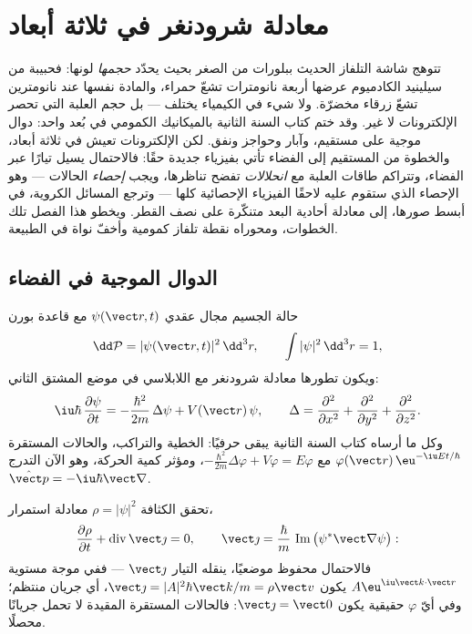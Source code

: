 \chapter{معادلة شرودنغر في ثلاثة أبعاد}\label{ch:b3:schrodinger-three-dimensions}

تتوهج شاشة التلفاز الحديث ببلورات من الصغر بحيث يحدّد
\emph{حجمها} لونها: فحبيبة من سيلينيد الكادميوم عرضها أربعة
نانومترات تشعّ حمراء، والمادة نفسها عند نانومترين تشعّ زرقاء
مخضرّة. ولا شيء في الكيمياء يختلف --- بل حجم العلبة التي تحصر
الإلكترونات لا غير. وقد ختم كتاب السنة الثانية بالميكانيك
الكمومي في بُعد واحد: دوال موجية على مستقيم، وآبار وحواجز ونفق.
لكن الإلكترونات تعيش في ثلاثة أبعاد، والخطوة من المستقيم إلى
الفضاء تأتي بفيزياء جديدة حقًا: فالاحتمال يسيل تيارًا عبر
الفضاء، وتتراكم طاقات العلبة مع \emph{انحلالات} تفضح تناظرها،
ويجب \emph{إحصاء} الحالات --- وهو الإحصاء الذي ستقوم عليه لاحقًا
الفيزياء الإحصائية كلها --- وترجع المسائل الكروية، في أبسط
صورها، إلى معادلة أحادية البعد متنكّرة على نصف القطر. ويخطو هذا
الفصل تلك الخطوات، ومحوراه نقطة تلفاز كمومية وأخفّ نواة في
الطبيعة.

\section{الدوال الموجية في الفضاء}

\begin{definition}\label{def:b3:schrodinger-three-dimensions:psi3d}
حالة الجسيم مجال عقدي $\psi(\vect r, t)$ مع
قاعدة بورن
\[
\dd\mathcal P = |\psi(\vect r, t)|^2\,\dd^3r , \qquad
\int|\psi|^2\,\dd^3r = 1 ,
\]
ويكون تطورها معادلة شرودنغر مع اللابلاسي في
موضع المشتق الثاني:
\[
\iu\hbar\,\frac{\partial\psi}{\partial t}
 = -\frac{\hbar^2}{2m}\,\Delta\psi + V(\vect r)\,\psi ,
\qquad
\Delta = \frac{\partial^2}{\partial x^2} +
\frac{\partial^2}{\partial y^2} + \frac{\partial^2}{\partial z^2} .
\]
وكل ما أرساه كتاب السنة الثانية يبقى حرفيًا:
الخطية والتراكب، والحالات المستقرة
$\varphi(\vect r)\,\eu^{-\iu Et/\hbar}$ مع
$-\tfrac{\hbar^2}{2m}\Delta\varphi + V\varphi = E\varphi$، ومؤثر
كمية الحركة، وهو الآن التدرج $\hat{\vect p} =
-\iu\hbar\vect\nabla$.
\end{definition}

\begin{proposition}\label{prop:b3:schrodinger-three-dimensions:current}
تحقق الكثافة $\rho = |\psi|^2$ معادلة استمرار،
\[
\frac{\partial\rho}{\partial t} + \operatorname{div}\vect\jmath = 0 ,
\qquad
\vect\jmath = \frac{\hbar}{m}\,
\operatorname{Im}\big(\psi^*\vect\nabla\psi\big) :
\]
فالاحتمال محفوظ موضعيًا، ينقله التيار
$\vect\jmath$ --- ففي موجة مستوية $A\eu^{\iu\vect k\cdot\vect r}$ يكون
$\vect\jmath = |A|^2\hbar\vect k/m = \rho\vect v$، أي جريان منتظم؛
وفي أيّ $\varphi$ حقيقية يكون $\vect\jmath = \vect 0$: فالحالات
المستقرة المقيدة لا تحمل جريانًا محصلًا.
\end{proposition}


